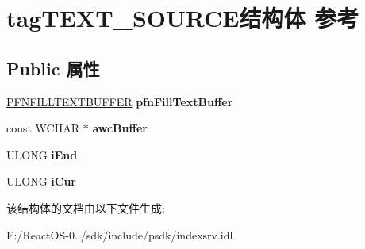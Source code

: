 \hypertarget{structtag_t_e_x_t___s_o_u_r_c_e}{}\section{tag\+T\+E\+X\+T\+\_\+\+S\+O\+U\+R\+C\+E结构体 参考}
\label{structtag_t_e_x_t___s_o_u_r_c_e}
\subsection*{Public 属性}
\begin{DoxyCompactItemize}
\item 
\mbox{\label{structtag_t_e_x_t___s_o_u_r_c_e_aa9542b6c578f2f053035349c76d89dac}} 
\hyperlink{interfacevoid}{P\+F\+N\+F\+I\+L\+L\+T\+E\+X\+T\+B\+U\+F\+F\+ER} {\bfseries pfn\+Fill\+Text\+Buffer}
\item 
\mbox{\label{structtag_t_e_x_t___s_o_u_r_c_e_a27303ebbf7dc4e2fddd4cbfbb07e1cad}} 
const W\+C\+H\+AR $\ast$ {\bfseries awc\+Buffer}
\item 
\mbox{\label{structtag_t_e_x_t___s_o_u_r_c_e_a3ac6afe7eec4dc0c0bccba85457dc4a7}} 
U\+L\+O\+NG {\bfseries i\+End}
\item 
\mbox{\label{structtag_t_e_x_t___s_o_u_r_c_e_a1f4b71e5d2b86e8611a2b6f640636017}} 
U\+L\+O\+NG {\bfseries i\+Cur}
\end{DoxyCompactItemize}


该结构体的文档由以下文件生成\+:\begin{DoxyCompactItemize}
\item 
E\+:/\+React\+O\+S-\/0../sdk/include/psdk/indexsrv.\+idl\end{DoxyCompactItemize}
